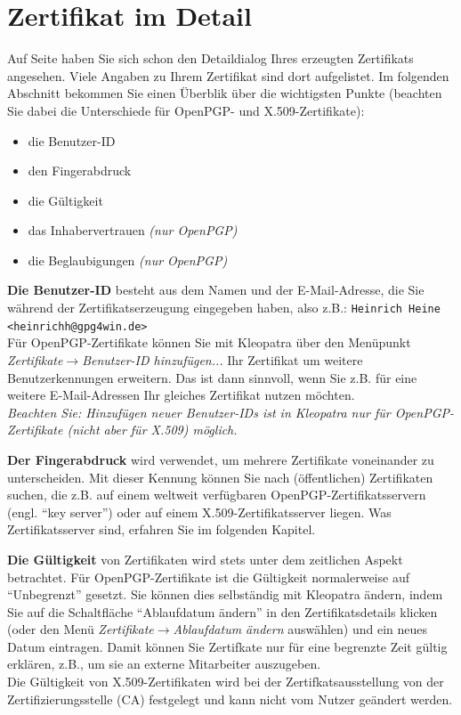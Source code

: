 \documentclass[a4paper,11pt, oneside,openright,titlepage,dvips]{scrbook}
\newcommand{\Menu}[1]{\emph{#1}}
\newcommand{\Email}{E-Mail}
\newcounter{chapter}
\begin{document}
\clearpage
\chapter{Zertifikat im Detail}
\label{ch:CertificateDetails}

Auf Seite \pageref{sec_finishKeyPairGeneration} haben Sie sich schon
den Detaildialog Ihres erzeugten Zertifikats angesehen. Viele Angaben
zu Ihrem Zertifikat sind dort aufgelistet. Im
folgenden Abschnitt bekommen Sie einen Überblik über die wichtigsten
Punkte (beachten Sie dabei die Unterschiede für
OpenPGP- und X.509-Zertifikate):

\begin{itemize}
\item die Benutzer-ID
\item den Fingerabdruck
\item die Gültigkeit
\item das Inhabervertrauen \textit{(nur OpenPGP)}
\item die Beglaubigungen \textit{(nur OpenPGP)}
\end{itemize}

\textbf{Die Benutzer-ID} besteht aus dem Namen und der
\Email{}-Adresse, die Sie während der Zertifikatserzeugung eingegeben
haben, also z.B.: \verb=Heinrich Heine <heinrichh@gpg4win.de>=\\
Für OpenPGP-Zertifikate können Sie mit Kleopatra über den Menüpunkt
\Menu{Zertifikate$\rightarrow$Benutzer-ID hinzufügen...} Ihr
Zertifikat um weitere Benutzerkennungen erweitern. Das ist dann
sinnvoll, wenn Sie z.B. für eine weitere \Email{}-Adressen Ihr gleiches
Zertifikat nutzen möchten.\\
\textit{Beachten Sie: Hinzufügen neuer Benutzer-IDs ist in Kleopatra
nur für OpenPGP-Zertifikate (nicht aber für X.509) möglich.}

\textbf{Der Fingerabdruck} wird verwendet, um mehrere
Zertifikate voneinander zu unterscheiden. Mit dieser Kennung können
Sie nach (öffentlichen) Zertifikaten suchen, die z.B. auf einem
weltweit verfügbaren OpenPGP-Zertifikatsservern (engl. "`key server"') oder auf einem
X.509-Zertifikatsserver liegen.
Was Zertifikatsserver sind, erfahren Sie im folgenden Kapitel.

\textbf{Die Gültigkeit} von Zertifikaten wird stets unter dem
zeitlichen Aspekt betrachtet. Für OpenPGP-Zertifikate ist die
Gültigkeit normalerweise auf "`Unbegrenzt"' gesetzt. Sie können dies
selbständig mit Kleopatra ändern, indem Sie auf die Schaltfläche
"`Ablaufdatum ändern"' in den Zertifikatsdetails klicken (oder den Menü
\Menu{Zertifikate$\rightarrow$Ablaufdatum ändern} auswählen) 
und ein neues Datum eintragen. Damit können
Sie Zertifkate nur für eine begrenzte Zeit gültig erklären, z.B., 
um sie an externe Mitarbeiter auszugeben.\\
Die Gültigkeit von X.509-Zertifikaten wird bei der Zertifkatsausstellung
von der Zertifizierungsstelle (CA) festgelegt und kann nicht vom Nutzer
geändert werden.
\end{document}
